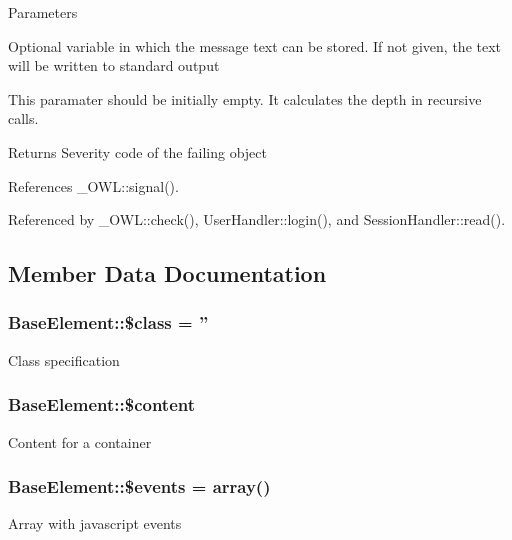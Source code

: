 \begin{DoxyParams}{Parameters}
\item[\mbox{\tt[out]} {\em \$text}]Optional variable in which the message text can be stored. If not given, the text will be written to standard output \item[\mbox{\tt[in]} {\em \$depth}]This paramater should be initially empty. It calculates the depth in recursive calls. \end{DoxyParams}
\begin{DoxyReturn}{Returns}
Severity code of the failing object 
\end{DoxyReturn}


References \_\-OWL::signal().



Referenced by \_\-OWL::check(), UserHandler::login(), and SessionHandler::read().



\subsection{Member Data Documentation}
\subsubsection[{\$class}]{\setlength{\rightskip}{0pt plus 5cm}BaseElement::\$class = ''}\label{classBaseElement_a99976a8e967db92e7800309f359b0803}
Class specification 
\subsubsection[{\$content}]{\setlength{\rightskip}{0pt plus 5cm}BaseElement::\$content}\label{classBaseElement_ac2c7999af8528ffd86f3f1864028948a}
Content for a container 
\subsubsection[{\$events}]{\setlength{\rightskip}{0pt plus 5cm}BaseElement::\$events = array()}\label{classBaseElement_a02cebe45d277b4ff8f29db08bad371ba}
Array with javascript events 


